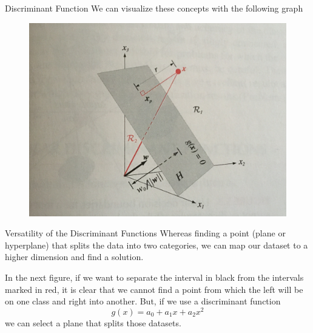 \documentclass{beamer}
\begin{document}
\begin{frame}{Discriminant Function }
	We can visualize these concepts with the following graph
\begin{figure}
	\centering
	\includegraphics[scale=0.05]{../../Figures/fig_duda_linear.jpg}
\end{figure}	
	
\end{frame}


\begin{frame}{Versatility of the Discriminant Functions}
	Whereas finding a point (plane or hyperplane) that splits the data into two categories, we can map our dataset to a higher dimension and find a solution.
	
	In the next figure, if we want to separate the interval in black from the intervals marked in red, it is clear that we cannot find a point from which the left will be on one class and right into another. But, if we use a discriminant function
	\begin{equation*}
		g(x)= a_0+ a_1 x + a_2 x^2
	\end{equation*}
	we can select a plane that splits those datasets.
	
\end{frame}
\end{document}

